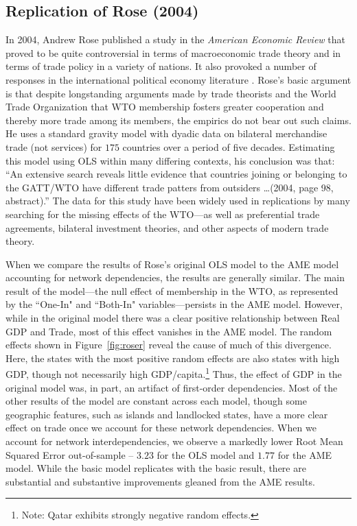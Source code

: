 \subsection{Replication of Rose (2004)}

In 2004, Andrew Rose published a study in the \textit{American Economic Review} \nocite{rose:2004} that proved to be quite controversial in terms of macroeconomic trade theory and in terms of trade policy in a variety of nations. It also provoked a number of responses in the international political economy literature \cite{tomz:etal:2007,ward:etal:2013}.  Rose's basic argument is that despite longstanding arguments made by trade theorists and the World Trade Organization that WTO membership fosters greater cooperation and thereby more trade among its members, the empirics do not bear out such claims. He uses a standard gravity model with dyadic data on bilateral merchandise trade (not services) for $175$ countries over a period of five decades. Estimating this model using OLS within many differing contexts, his conclusion was that: ``An extensive search reveals little evidence that countries joining or belonging to the GATT/WTO have different trade patters from outsiders \ldots (2004, page 98, abstract).''  The data for this study have been widely used in replications by many searching for the missing effects of the WTO---as well as preferential trade agreements, bilateral investment theories, and other aspects of modern trade theory.  

When we compare the results of Rose's original OLS model to the AME model accounting for network dependencies, the results are generally similar. The main result of the model---the null effect of membership in the WTO, as represented by the ``One-In" and ``Both-In" variables---persists in the AME model. However, while in the original model there was a clear positive relationship between Real GDP and Trade, most of this effect vanishes in the AME model. The random effects shown in Figure~\ref{fig:roser} reveal the cause of much of this divergence. Here, the states with the most positive random effects are also states with high GDP, though not necessarily high GDP/capita.\footnote{Note: Qatar exhibits strongly negative random effects.} Thus, the effect of GDP in the original model was, in part, an artifact of first-order dependencies. Most of the other results of the model are constant across each model, though some geographic features, such as islands and landlocked states, have a more clear effect on trade once we account for these network dependencies. When we account for network interdependencies, we observe a markedly lower Root Mean Squared Error out-of-sample -- $3.23$ for the OLS model and $1.77$ for the AME model. While the basic model replicates with the basic result, there are substantial and substantive improvements gleaned from the AME results.

